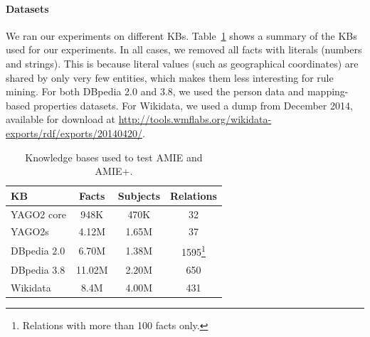 \paragraph{Datasets} We ran our experiments on different KBs. Table~\ref{kbs} shows a summary of the KBs used for our experiments.
In all cases, we removed all facts with literals (numbers and strings).
This is because literal values (such as geographical coordinates) are shared by only very few entities,
which makes them less interesting for rule mining.
For both DBpedia 2.0 and 3.8, we used the person data and mapping-based properties datasets.
For Wikidata, we used a dump from December 2014, available for download at \url{http://tools.wmflabs.org/wikidata-exports/rdf/exports/20140420/}.

\begin{savenotes}
\begin{table}
\footnotesize
\begin{tabular}{l|c|c|c}
KB & Facts & Subjects & Relations\\
\hline
YAGO2 core  & 948K & 470K & 32\\
YAGO2s & 4.12M  & 1.65M & 37\\
DBpedia 2.0 & 6.70M & 1.38M & 1595\footnote{Relations with more than 100 facts only.} \\
DBpedia 3.8 & 11.02M & 2.20M & 650 \\
Wikidata & 8.4M & 4.00M & 431
\end{tabular}
\caption{Knowledge bases used to test AMIE and AMIE+.}
\label{kbs}
\end{table}
\end{savenotes}

